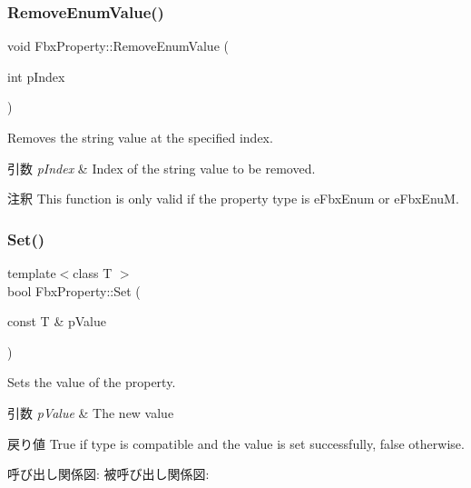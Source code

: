 \subsubsection{\texorpdfstring{Remove\+Enum\+Value()}{RemoveEnumValue()}}
{\footnotesize\ttfamily void Fbx\+Property\+::\+Remove\+Enum\+Value (\begin{DoxyParamCaption}\item[{int}]{p\+Index }\end{DoxyParamCaption})}

Removes the string value at the specified index. 
\begin{DoxyParams}{引数}
{\em p\+Index} & Index of the string value to be removed. \\
\hline
\end{DoxyParams}
\begin{DoxyRemark}{注釈}
This function is only valid if the property type is e\+Fbx\+Enum or e\+Fbx\+EnuM. 
\end{DoxyRemark}
\mbox{\label{class_fbx_property_a7854464326c74ce7caee2a4263284a46}} 
\subsubsection{\texorpdfstring{Set()}{Set()}\hspace{0.1cm}{\footnotesize\ttfamily [1/2]}}
{\footnotesize\ttfamily template$<$class T $>$ \\
bool Fbx\+Property\+::\+Set (\begin{DoxyParamCaption}\item[{const T \&}]{p\+Value }\end{DoxyParamCaption})}

Sets the value of the property. 
\begin{DoxyParams}{引数}
{\em p\+Value} & The new value \\
\hline
\end{DoxyParams}
\begin{DoxyReturn}{戻り値}
{\ttfamily True} if type is compatible and the value is set successfully, {\ttfamily false} otherwise. 
\end{DoxyReturn}
呼び出し関係図\+:
被呼び出し関係図\+:
\mbox{\label{class_fbx_property_aa89d91b8bf335921748ea21ab08eb9a3}} 
